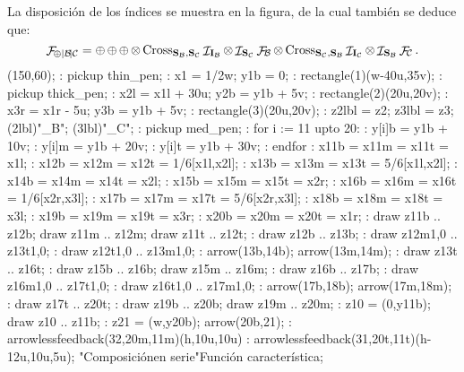 La disposición de los índices se muestra en la figura, de la cual
también se deduce que:
 $$ \F_{\srl\!|B\!|C} = \srl \srl \srl
    \prl \op{Cross}_{\st B,\st C} \ID_{\inp B}
    \prl \ID_{\st C} \F_B
    \prl \op{Cross}_{\st C,\st B} \ID_{\inp C}
    \prl \ID_{\st B} \F_C .$$
\MTbeginfigure(150,60);
 \MT: pickup thin_pen;
 \MT: x1 = 1/2w; y1b = 0;
 \MT: rectangle(1)(w-40u,35v); %
 \MT: pickup thick_pen;
 \MT: x2l = x1l + 30u; y2b = y1b + 5v;
 \MT: rectangle(2)(20u,20v); %
 \MT: x3r = x1r - 5u; y3b = y1b + 5v;
 \MT: rectangle(3)(20u,20v); %
 \MT: z2lbl = z2; z3lbl = z3;
 \MTlabel(2lbl)"\F_B";
 \MTlabel(3lbl)"\F_C";
 \MT: pickup med_pen;
 \MT: for i := 11 upto 20:
 \MT:  y[i]b = y1b + 10v;
 \MT:  y[i]m = y1b + 20v;
 \MT:  y[i]t = y1b + 30v;
 \MT: endfor
 \MT: x11b = x11m = x11t = x1l;
 \MT: x12b = x12m = x12t = 1/6[x1l,x2l];
 \MT: x13b = x13m = x13t = 5/6[x1l,x2l];
 \MT: x14b = x14m = x14t = x2l;
 \MT: x15b = x15m = x15t = x2r;
 \MT: x16b = x16m = x16t = 1/6[x2r,x3l];
 \MT: x17b = x17m = x17t = 5/6[x2r,x3l];
 \MT: x18b = x18m = x18t = x3l;
 \MT: x19b = x19m = x19t = x3r;
 \MT: x20b = x20m = x20t = x1r;
 \MT: draw z11b .. z12b; draw z11m .. z12m; draw z11t .. z12t;
 \MT: draw z12b .. z13b;
 \MT: draw z12m{1,0} .. z13t{1,0};
 \MT: draw z12t{1,0} .. z13m{1,0};
 \MT: arrow(13b,14b); arrow(13m,14m);
 \MT: draw z13t .. z16t;
 \MT: draw z15b .. z16b; draw z15m .. z16m;
 \MT: draw z16b .. z17b;
 \MT: draw z16m{1,0} .. z17t{1,0};
 \MT: draw z16t{1,0} .. z17m{1,0};
 \MT: arrow(17b,18b); arrow(17m,18m);
 \MT: draw z17t .. z20t;
 \MT: draw z19b .. z20b; draw z19m .. z20m;
 \MT: z10 = (0,y11b); draw z10 .. z11b;
 \MT: z21 = (w,y20b); arrow(20b,21);
 \MT: arrowlessfeedback(32,20m,11m)(h,10u,10u)
 \MT: arrowlessfeedback(31,20t,11t)(h-12u,10u,5u);
\MTendfigure"Composición\cr en serie"Función característica;

